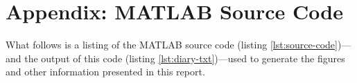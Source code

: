 \documentclass{ajhlabreport}
\begin{document}
\newpage
\chapter{Appendix: MATLAB Source Code}

What follows is a listing of the MATLAB source code (listing
\ref{lst:source-code})---and the output of this code (listing
\ref{lst:diary-txt})---used to generate the figures and other information
presented in this report.



\end{document}
